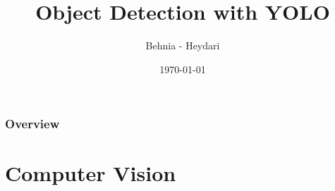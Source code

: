 \documentclass{beamer}
\title[YOLO]{Object Detection with YOLO} %
\author{Behnia - Heydari} %
\institute[AUT] %
{
Amirkabir University of Technology \\ %
\medskip
\textit{} %
}
\date{\today} %
\begin{document}
\begin{frame}
\titlepage %
\end{frame}

\begin{frame}
\frametitle{Overview} %
\tableofcontents %
\end{frame}


\section{Computer Vision} %

\end{document}
